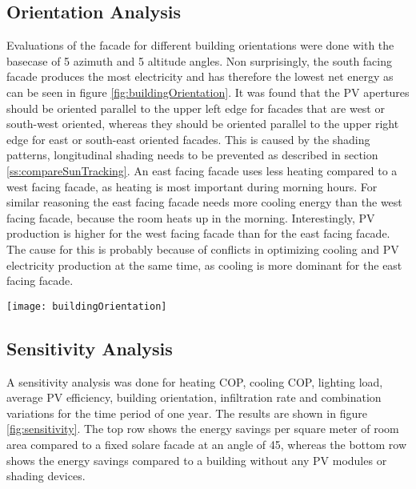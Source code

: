 	\subsection{Orientation Analysis}

		Evaluations of the facade for different building orientations were done with the basecase of 5 azimuth and 5 altitude angles. Non surprisingly, the south facing facade produces the most electricity and has therefore the lowest net energy as can be seen in figure \ref{fig:buildingOrientation}. It was found that the PV apertures should be oriented parallel to the upper left edge for facades that are west or south-west oriented, whereas they should be oriented parallel to the upper right edge for east or south-east oriented facades. This is caused by the shading patterns, longitudinal shading needs to be prevented as described in section \ref{ss:compareSunTracking}. An east facing facade uses less heating compared to a west facing facade, as heating is most important during morning hours. For similar reasoning the east facing facade needs more cooling energy than the west facing facade, because the room heats up in the morning. Interestingly, PV production is higher for the west facing facade than for the east facing facade. The cause for this is probably because of conflicts in optimizing cooling and PV electricity production at the same time, as cooling is more dominant for the east facing facade. 

		\begin{figure*}
		\begin{center}
		\texttt{[image: buildingOrientation]}
		\caption{Energy demand in dependence of building orientation. South facing facades perform best.}
		\label{fig:buildingOrientation}
		\end{center}
		\end{figure*}

	\subsection{Sensitivity Analysis}

		A sensitivity analysis was done for heating COP, cooling COP, lighting load, average PV efficiency, building orientation, infiltration rate and combination variations for the time period of one year. The results are shown in figure \ref{fig:sensitivity}. The top row shows the energy savings per square meter of room area compared to a fixed solare facade at an angle of 45\degree, whereas the bottom row shows the energy savings compared to a building without any PV modules or shading devices. 

